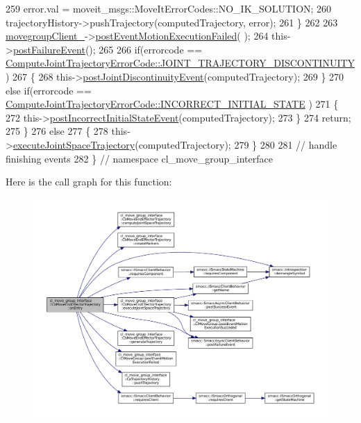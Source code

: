 \begin{DoxyCode}
259                 error.val = moveit\_msgs::MoveItErrorCodes::NO\_IK\_SOLUTION;
260                 trajectoryHistory->pushTrajectory(computedTrajectory, error);
261             \}
262 
263             \hyperlink{classcl__move__group__interface_1_1CbMoveEndEffectorTrajectory_aea650d3e7836125b32be97392b71a7f3}{movegroupClient\_}->\hyperlink{classcl__move__group__interface_1_1ClMoveGroup_a39dc3871d29b2af1ab739057f6ca6daa}{postEventMotionExecutionFailed}(
      );
264             this->\hyperlink{classsmacc_1_1SmaccAsyncClientBehavior_af6fa358cb1ab5ed16791a201f59260e0}{postFailureEvent}();
265 
266             \textcolor{keywordflow}{if}(errorcode == 
      \hyperlink{namespacecl__move__group__interface_ae5fc1caf9a16ae5ad1c97c2e137a7017a3e86842785cd7c42003e516418347c8e}{ComputeJointTrajectoryErrorCode::JOINT\_TRAJECTORY\_DISCONTINUITY}
      )
267             \{
268                 this->\hyperlink{classcl__move__group__interface_1_1CbMoveEndEffectorTrajectory_a308331beab9b2ec0eae72fa56fa999c9}{postJointDiscontinuityEvent}(computedTrajectory);
269             \}
270             \textcolor{keywordflow}{else} \textcolor{keywordflow}{if}(errorcode == 
      \hyperlink{namespacecl__move__group__interface_ae5fc1caf9a16ae5ad1c97c2e137a7017a1b748367c8d468cb9b65ecd6b2eab32c}{ComputeJointTrajectoryErrorCode::INCORRECT\_INITIAL\_STATE}
      )
271             \{
272                 this->\hyperlink{classcl__move__group__interface_1_1CbMoveEndEffectorTrajectory_a6180230347c922fa0d85f514ce5029df}{postIncorrectInitialStateEvent}(computedTrajectory);
273             \}
274             \textcolor{keywordflow}{return};
275         \}
276         \textcolor{keywordflow}{else}
277         \{
278             this->\hyperlink{classcl__move__group__interface_1_1CbMoveEndEffectorTrajectory_a3a75fa185c62591e1869427650338a32}{executeJointSpaceTrajectory}(computedTrajectory);
279         \}
280 
281         \textcolor{comment}{// handle finishing events}
282     \} \textcolor{comment}{// namespace cl\_move\_group\_interface}
\end{DoxyCode}
Here is the call graph for this function\+:
\nopagebreak
\begin{figure}[H]
\begin{center}
\leavevmode
\includegraphics[width=350pt]{classcl__move__group__interface_1_1CbMoveEndEffectorTrajectory_aaedd074fd178c6390a4a3f1ccff23ad3_cgraph}
\end{center}
\end{figure}
